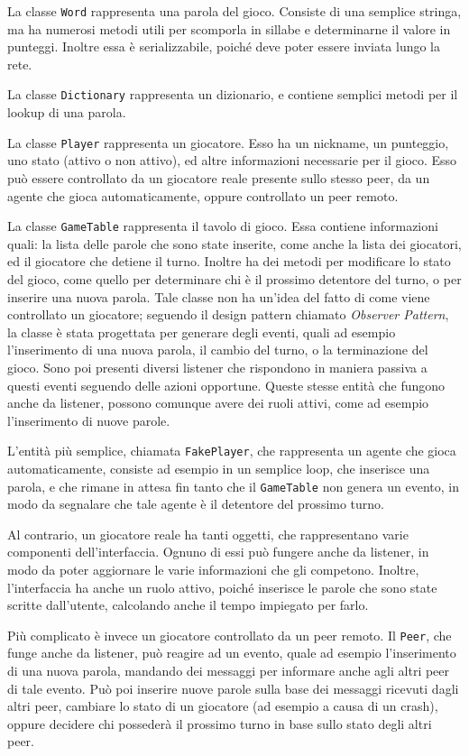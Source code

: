 \documentclass[10.5pt]{article}
\begin{document}
La classe \texttt{Word} rappresenta una parola del gioco. Consiste di una semplice stringa, ma ha numerosi metodi utili per scomporla in sillabe e determinarne il valore in punteggi. Inoltre essa è serializzabile, poiché deve poter essere inviata lungo la rete.  

La classe \texttt{Dictionary} rappresenta un dizionario, e contiene semplici metodi per il lookup di una parola.

La classe \texttt{Player} rappresenta un giocatore. Esso ha un nickname, un punteggio, uno stato (attivo o non attivo), ed altre informazioni necessarie per il gioco. Esso può essere controllato da un giocatore reale presente sullo stesso peer, da un agente che gioca automaticamente, oppure controllato un peer remoto.

La classe \texttt{GameTable} rappresenta il tavolo di gioco. Essa contiene informazioni quali: la lista delle parole che sono state inserite, come anche la lista dei giocatori, ed il giocatore che detiene il turno. Inoltre ha dei metodi per modificare lo stato del gioco, come quello per determinare chi è il prossimo detentore del turno, o per inserire una nuova parola. Tale classe non ha un'idea del fatto di come viene controllato un giocatore; seguendo il design pattern chiamato \textit{Observer Pattern}, la classe è stata progettata per generare degli eventi, quali ad esempio l'inserimento di una nuova parola, il cambio del turno, o la terminazione del gioco. Sono poi presenti diversi listener che rispondono in maniera passiva a questi eventi seguendo delle azioni opportune. Queste stesse entità che fungono anche da listener, possono comunque avere dei ruoli attivi, come ad esempio l'inserimento di nuove parole. 

L'entità più semplice, chiamata \texttt{FakePlayer}, che rappresenta un agente che gioca automaticamente, consiste ad esempio in un semplice loop, che inserisce una parola, e che rimane in attesa fin tanto che il \texttt{GameTable} non genera un evento, in modo da segnalare che tale agente è il detentore del prossimo turno. 

Al contrario, un giocatore reale ha tanti oggetti, che rappresentano varie componenti dell'interfaccia. Ognuno di essi può fungere anche da listener, in modo da poter aggiornare le varie informazioni che gli competono. Inoltre, l'interfaccia ha anche un ruolo attivo, poiché inserisce le parole che sono state scritte dall'utente, calcolando anche il tempo impiegato per farlo.

Più complicato è invece un giocatore controllato da un peer remoto. Il \texttt{Peer}, che funge anche da listener, può reagire ad un evento, quale ad esempio l'inserimento di una nuova parola, mandando dei messaggi per informare anche agli altri peer di tale evento. Può poi inserire nuove parole sulla base dei messaggi ricevuti dagli altri peer, cambiare lo stato di un giocatore (ad esempio a causa di un crash), oppure decidere chi possederà il prossimo turno in base sullo stato degli altri peer.
\end{document}
